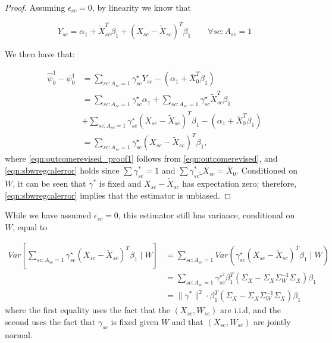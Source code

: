 \begin{proof}
Assuming $\epsilon_{sc} = 0$, by linearity we know that

\begin{equation}\label{eqn:outcomerevised}
Y_{sc} = \alpha_1 + \tilde{X}_{sc}^T\beta_1 + (X_{sc} - \tilde{X}_{sc})^T\beta_1 \qquad \forall sc: A_{sc} = 1
\end{equation}

We then have that:

\begin{align}\nonumber
    \hat{\psi}^1_0 - \psi_0^1 &= \sum_{sc: A_{sc} = 1}\gamma_{sc}^\star Y_{sc} - (\alpha_1 + \bar{X}_0^T\beta_1) \\
    \nonumber &= \sum_{sc: A_{sc} = 1}\gamma_{sc}^\star\alpha_1 + \sum_{sc: A_{sc} = 1}\gamma_{sc}^\star\tilde{X}_{sc}^T\beta_1 \\ 
    &+ \sum_{sc: A_{sc} = 1}\gamma_{sc}^\star(X_{sc} - \tilde{X}_{sc})^T\beta_1 - (\alpha_1 + \bar{X}_0^T\beta_1) \label{eqn:outcomerevised_proof1}\\
    &= \sum_{sc: A_{sc} = 1}\gamma_{sc}^\star(X_{sc} - \tilde{X}_{sc})^T\beta_1\label{eqn:sbwregcalerror},
\end{align}
where \eqref{eqn:outcomerevised_proof1} follows from \eqref{eqn:outcomerevised}, and \eqref{eqn:sbwregcalerror} holds since $\sum \gamma_{sc}^* = 1$ and $\sum \gamma_{sc}^* \tilde_{X}_{sc} = \bar{X}_0$. Conditioned on $W$, it can be seen that $\gamma^*$ is fixed and $X_{sc} - \tilde{X}_{sc}$ has expectation zero; therefore, \eqref{eqn:sbwregcalerror} implies that the estimator is unbiased.
\end{proof}

\begin{remark}
While we have assumed $\epsilon_{sc}=0$, this estimator still has variance, conditional on $W$, equal to

\begin{align}
\nonumber Var[\sum_{sc: A_{sc} = 1}\gamma_{sc}^\star(X_{sc} - \tilde{X}_{sc})^T\beta_1 \mid W] &= \sum_{sc: A_{sc} = 1} Var(\gamma_{sc}^\star(X_{sc} - \tilde{X}_{sc})^T\beta_1 \mid W) \\
\nonumber &= \sum_{sc: A_{sc} = 1} \gamma_{sc}^{\star^2}\beta_1^T(\Sigma_{X} - \Sigma_{X}\Sigma_{W}^{-1}\Sigma_{X})\beta_1  \\
& = \|\gamma^*\|^2 \cdot \beta_1^T(\Sigma_{X} - \Sigma_{X}\Sigma_{W}^{-1}\Sigma_{X})\beta_1  \label{eqn:variance}
\end{align}
%
where the first equality uses the fact that the $(X_{sc}, W_{sc})$ are i.i.d, and the second uses the fact that $\gamma_{sc}$ is fixed given $W$ and that $(X_{sc}, W_{sc})$ are jointly normal. %
\end{remark}


